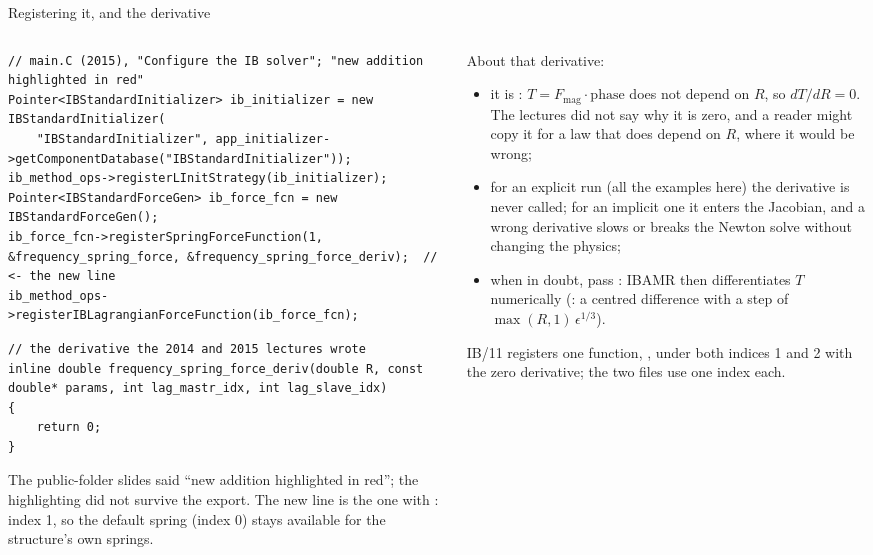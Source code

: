 \documentclass[aspectratio=169,11pt]{beamer}
\begin{document}
\begin{frame}[fragile]{Registering it, and the derivative}
\label{fr:register}
\begin{columns}[T,onlytextwidth]
\begin{column}{0.52\textwidth}
\begin{lstlisting}[style=cpptiny]
// main.C (2015), "Configure the IB solver"; "new addition highlighted in red"
Pointer<IBStandardInitializer> ib_initializer = new IBStandardInitializer(
    "IBStandardInitializer", app_initializer->getComponentDatabase("IBStandardInitializer"));
ib_method_ops->registerLInitStrategy(ib_initializer);
Pointer<IBStandardForceGen> ib_force_fcn = new IBStandardForceGen();
ib_force_fcn->registerSpringForceFunction(1, &frequency_spring_force, &frequency_spring_force_deriv);  // <- the new line
ib_method_ops->registerIBLagrangianForceFunction(ib_force_fcn);
\end{lstlisting}
\begin{lstlisting}[style=cpptiny]
// the derivative the 2014 and 2015 lectures wrote
inline double frequency_spring_force_deriv(double R, const double* params, int lag_mastr_idx, int lag_slave_idx)
{
    return 0;
}
\end{lstlisting}
\footnotesize The public-folder slides said ``new addition highlighted in red''; the highlighting did not survive the export. The new line is the one with : index 1, so the default spring (index 0) stays available for the structure's own springs.
\end{column}
\begin{column}{0.46\textwidth}
\footnotesize About that derivative:
\begin{itemize}
  \item it is : $T = F_{\mathrm{mag}}\cdot\mathrm{phase}$ does not depend on $R$, so $dT/dR = 0$. The lectures did not say why it is zero, and a reader might copy it for a law that does depend on $R$, where it would be wrong;
  \item for an explicit run (all the examples here) the derivative is never called; for an implicit one it enters the Jacobian, and a wrong derivative slows or breaks the Newton solve without changing the physics;
  \item when in doubt, pass : IBAMR then differentiates $T$ numerically (: a centred difference with a step of $\max(R, 1)\,\epsilon^{1/3}$).
\end{itemize}
\footnotesize IB/11 registers one function, , under both indices 1 and 2 with the zero derivative; the two  files use one index each.
\end{column}
\end{columns}
\end{frame}
\end{document}

